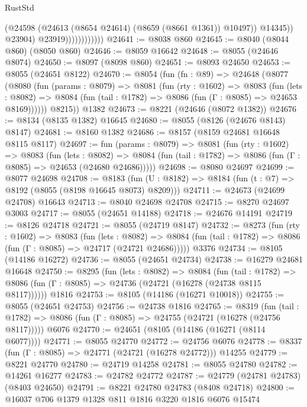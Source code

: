 \begin{lexlean}{RustStd}
\begin{coremodule}
                                  (@24598 (@24613 (@8654 @24614) (@8659 (@8661 @1361)) @10497))
                                  @14345))
                              @23904)
                            @23919))))))))))))
@24641 := @8038 @860
@24645 := @8040 (@8044 @860) (@8050 @860)
@24646 := @8059 @16642
@24648 := @8055 (@24646 @8074)
@24650 := @8097 (@8098 @860)
@24651 := @8093 @24650
@24653 := @8055 (@24651 @8122)
@24670 := @8054
    (fun (fn : @89) =>
    @24648
      (@8077
        (@8080
          (fun (params : @8079) =>
          @8081
            (fun (rty : @1602) =>
            @8083
              (fun (lets : @8082) =>
              @8084 (fun (tail : @1782) => @8086 (fun (Γ : @8085) => @24653 @8169))))))
        @8215))
    @1382
@24673 := @8221 (@24646 (@8072 @1382))
@24676 := @8134 (@8135 @1382) @16645
@24680 := @8055 (@8126 (@24676 @8143) @8147)
@24681 := @8160 @1382
@24686 := @8157 (@8159 @24681 @16648 @8115 @8117)
@24697 := fun (params : @8079) =>
  @8081
    (fun (rty : @1602) =>
    @8083
      (fun (lets : @8082) =>
      @8084 (fun (tail : @1782) => @8086 (fun (Γ : @8085) => @24653 (@24680 @24686)))))
@24698 := @8080 @24697
@24699 := @8077 @24698
@24708 := @8183
    (fun (U : @8182) => @8184 (fun (t : @7) => @8192 (@8055 (@8198 @16645 @8073) @8209)))
@24711 := @24673 (@24699 @24708) @16643
@24713 := @8040 @24698 @24708
@24715 := @8270 @24697 @3003
@24717 := @8055 (@24651 @14188)
@24718 := @24676 @14191
@24719 := @8126 @24718
@24721 := @8055 (@24719 @8147)
@24732 := @8273
    (fun (rty : @1602) =>
    @8083
      (fun (lets : @8082) =>
      @8084 (fun (tail : @1782) => @8086 (fun (Γ : @8085) => @24717 (@24721 @24686)))))
    @3376
@24734 := @8105 (@14186 @16272)
@24736 := @8055 (@24651 @24734)
@24738 := @16279 @24681 @16648
@24750 := @8295
    (fun (lets : @8082) =>
    @8084
      (fun (tail : @1782) =>
      @8086 (fun (Γ : @8085) => @24736 (@24721 (@16278 (@24738 @8115 @8117))))))
    @1816
@24753 := @8105 (@14186 (@16271 @10018))
@24755 := @8055 (@24651 @24753)
@24756 := @24738 @1816
@24765 := @8319
    (fun (tail : @1782) => @8086 (fun (Γ : @8085) => @24755 (@24721 (@16278 (@24756 @8117)))))
    @6076
@24770 := @24651 (@8105 (@14186 (@16271 (@8114 @6077))))
@24771 := @8055 @24770
@24772 := @24756 @6076
@24778 := @8337 (fun (Γ : @8085) => @24771 (@24721 (@16278 @24772))) @14255
@24779 := @8221 @24770
@24780 := @24719 @14258
@24781 := @8055 @24780
@24782 := @14261 @16277
@24783 := @24782 @24772
@24787 := @24779 (@24781 @24783) (@8403 @24650)
@24791 := @8221 @24780 @24783 (@8408 @24718)
@24800 := @16037 @706 @1379 @1328 @811 @1816 @3220 @1816 @6076 @15474

\end{coremodule}
\end{lexlean}
